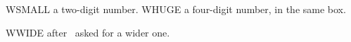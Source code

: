 

\setcounter{ExNo}{5}
\ea WSMALL a two-digit number.
\z
\setcounter{ExNo}{1000}
\ea WHUGE a four-digit number, in the same box.
\z

\ea WWIDE after \string\exewidth\ asked for a wider one.
\z

